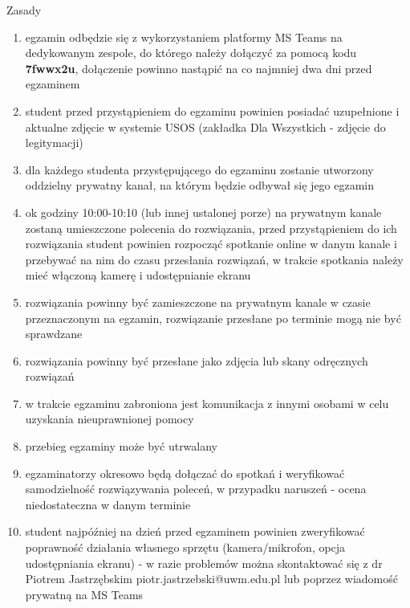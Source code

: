 \documentclass[12pt]{article}
\begin{document}
Zasady
\begin{enumerate}
\item egzamin odbędzie się z wykorzystaniem platformy MS Teams na dedykowanym zespole, do którego należy dołączyć za pomocą kodu \textbf{7fwwx2u}, dołączenie powinno nastąpić na co najmniej dwa dni przed egzaminem
\item student przed przystąpieniem do egzaminu powinien posiadać uzupełnione i aktualne zdjęcie w systemie USOS (zakładka Dla Wszystkich - zdjęcie do legitymacji)
\item dla każdego studenta przystępującego do egzaminu zostanie utworzony oddzielny prywatny kanał, na którym będzie odbywał się jego egzamin
\item ok godziny 10:00-10:10 (lub innej ustalonej porze) na prywatnym kanale zostaną umieszczone polecenia do rozwiązania, przed przystąpieniem do ich rozwiązania student powinien rozpocząć spotkanie online w danym kanale i przebywać na nim do czasu przesłania rozwiązań, w trakcie spotkania należy mieć włączoną kamerę i udostępnianie ekranu
\item rozwiązania powinny być zamieszczone na prywatnym kanale w czasie przeznaczonym na egzamin, rozwiązanie przesłane po terminie mogą nie być sprawdzane
\item rozwiązania powinny być przesłane jako zdjęcia lub skany odręcznych rozwiązań
\item w trakcie egzaminu zabroniona jest komunikacja z innymi osobami w celu uzyskania nieuprawnionej pomocy
\item przebieg egzaminy może być utrwalany
\item egzaminatorzy okresowo będą dołączać do spotkań i weryfikować samodzielność rozwiązywania poleceń, w przypadku naruszeń - ocena niedostateczna w danym terminie
\item student najpóźniej na dzień przed egzaminem powinien zweryfikować poprawność działania własnego sprzętu (kamera/mikrofon, opcja udostępniania ekranu) - w razie problemów można skontaktować się z dr Piotrem Jastrzębskim piotr.jastrzebski@uwm.edu.pl lub poprzez wiadomość prywatną na MS Teams
\end{enumerate}
\end{document}
